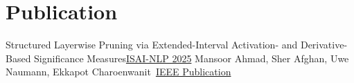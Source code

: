 
\section{Publication}
  \resumeSubHeadingListStart
    \resumePublication
    {Structured Layerwise Pruning via Extended-Interval Activation- and }{}
    {Derivative-Based Significance Measures}{\href{https://ieeexplore.ieee.org/document/11320543}{ISAI-NLP 2025}}
    {Mansoor Ahmad, Sher Afghan, Uwe Naumann, Ekkapot Charoenwanit}{\
    {\href{https://ieeexplore.ieee.org/document/11320543}{IEEE Publication}}}
  \resumeSubHeadingListEnd

  